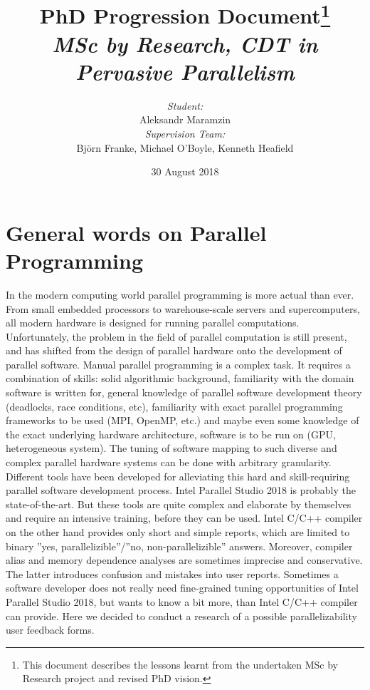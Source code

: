 \documentclass[12pt, a4paper]{article}
\title{
	PhD Progression Document\thanks{This document describes the lessons learnt from the undertaken MSc by Research project and revised PhD vision.}\\
	{\normalsize\textit{MSc by Research, CDT in Pervasive Parallelism}}
	}
\author{
	{\large\textit{Student:}}\\
	{\Large Aleksandr Maramzin}\\[0.5cm]
	{\large\textit{Supervision Team:}}\\
	{\Large Bj\"orn Franke, Michael O'Boyle, Kenneth Heafield}
}
\date{
	{\normalsize 30 August 2018}
}
\begin{document}
\maketitle
\section*{\centering	General words on Parallel Programming}
\qquad In the modern computing world parallel programming is more actual than ever. From small embedded processors to warehouse-scale servers and supercomputers, all modern hardware is designed for running parallel computations. Unfortunately, the problem in the field of parallel computation is still present, and has shifted from the design of parallel hardware onto the development of parallel software.\newline
\null\qquad Manual parallel programming is a complex task. It requires a combination of skills: solid algorithmic background, familiarity with the domain software is written for, general knowledge of parallel software development theory (deadlocks, race conditions, etc), familiarity with exact
parallel programming frameworks to be used (MPI, OpenMP, etc.) and maybe even some knowledge of the exact underlying hardware architecture, software is to be run on (GPU, heterogeneous system).\newline 
\null\qquad The tuning of software mapping to such diverse and complex parallel hardware systems can be done with arbitrary granularity. Different tools have been developed for alleviating this hard and skill-requiring parallel software development process. Intel Parallel Studio 2018 \cite{intel-parallel-studio} is probably the state-of-the-art. But these tools are quite complex and elaborate by themselves and require an intensive training, before they can be used. Intel C/C++ compiler on the other hand provides only short and simple reports, which are limited to binary ''yes, parallelizible''/''no, non-parallelizible'' answers. Moreover, compiler alias and memory dependence analyses are sometimes imprecise and conservative. The latter introduces confusion and mistakes into user reports.\newline
\null\qquad Sometimes a software developer does not really need fine-grained tuning opportunities of Intel Parallel Studio 2018, but wants to know a bit more, than Intel C/C++ compiler can provide. Here we decided to conduct a research of a possible parallelizability user feedback forms.
\end{document}
